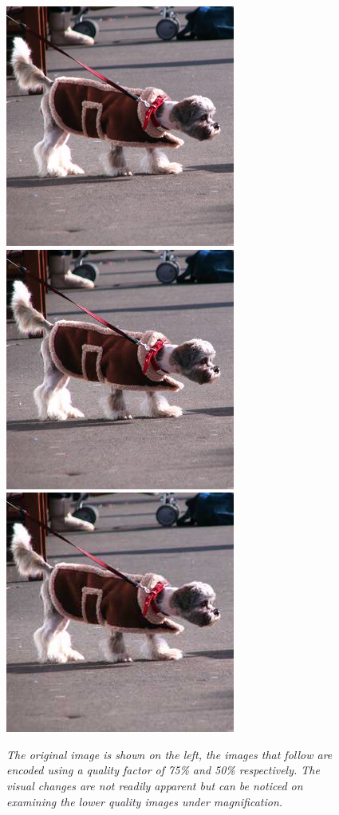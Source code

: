 \begin{figure}
\label{fig:jpgquality}
\includegraphics{dogorig}
\includegraphics{dog75}
\includegraphics{dog50}
\caption{\emph{The original image is shown on the left, the images that follow are encoded using a quality factor of 75\% and 50\% respectively. The visual changes are not readily apparent but can be noticed on examining the lower quality images under magnification.}}
\end{figure}
